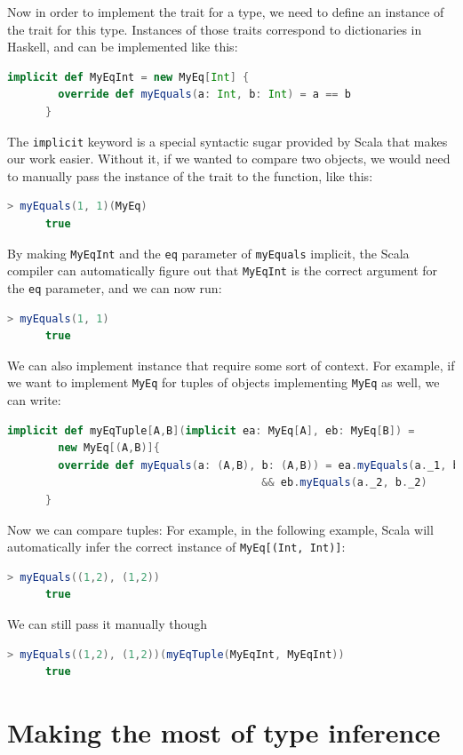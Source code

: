 \documentclass[abstracton,parskip=half]{scrreprt}
\newcommand{\cd}{\texttt}
\begin{document}
    Now in order to implement the trait for a type, we need to define an instance
    of the trait for this type. Instances of those traits correspond to dictionaries
    in Haskell, and can be implemented like this:
    \begin{lstlisting}[language=Scala,gobble=6]
      implicit def MyEqInt = new MyEq[Int] {
        override def myEquals(a: Int, b: Int) = a == b
      }
    \end{lstlisting}
    The \cd{implicit} keyword is a special syntactic sugar provided by Scala
    that makes our work easier. Without it, if we wanted to compare two objects,
    we would need to manually pass the instance of the trait to the function,
    like this:
    \begin{lstlisting}[language=Scala,gobble=6]
      > myEquals(1, 1)(MyEq)
      true
    \end{lstlisting}
    By making \cd{MyEqInt} and the \cd{eq} parameter of \cd{myEquals} implicit,
    the Scala compiler can automatically figure out that \cd{MyEqInt} is the
    correct argument for the \cd{eq} parameter, and we can now run:
    \begin{lstlisting}[language=Scala,gobble=6]
      > myEquals(1, 1)
      true
    \end{lstlisting}


    We can also implement instance that require some sort of context. For
    example, if we want to implement \cd{MyEq} for tuples of objects implementing
    \cd{MyEq} as well, we can write:
    \begin{lstlisting}[language=Scala,gobble=6]
      implicit def myEqTuple[A,B](implicit ea: MyEq[A], eb: MyEq[B]) =
        new MyEq[(A,B)]{
        override def myEquals(a: (A,B), b: (A,B)) = ea.myEquals(a._1, b._1)
                                        && eb.myEquals(a._2, b._2)
      }
    \end{lstlisting}
    Now we can compare tuples: For example, in the following example, Scala will
    automatically infer the correct instance of \cd{MyEq[(Int, Int)]}:
    \begin{lstlisting}[language=Scala,gobble=6]
      > myEquals((1,2), (1,2))
      true
    \end{lstlisting}
    We can still pass  it manually though
    \begin{lstlisting}[language=Scala,gobble=6]
      > myEquals((1,2), (1,2))(myEqTuple(MyEqInt, MyEqInt))
      true
    \end{lstlisting}

    \section{Making the most of type inference}
    \label{type-inference}
\end{document}
